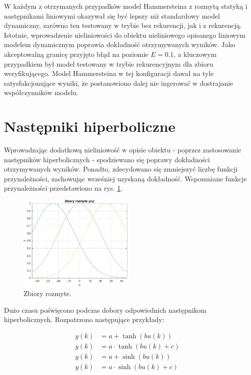 W każdym z otrzymanych przypadków model Hammersteina z rozmytą statyką i następnikami liniowymi okazywał się być lepszy niż standardowy model dynamiczny, zarówno ten testowany w trybie bez rekurencji, jak i z rekurencją. Istotnie, wprowadzenie nieliniowości do obiektu nieliniowego opisanego liniowym modelem dynamicznym poprawia dokładność otrzymywanych wyników. Jako akceptowalną granicę przyjęto błąd na poziomie $E = \num{0.1}$, a kluczowym przypadkiem był model testowany w trybie rekurencyjnym dla zbioru weryfikującego. Model Hammersteina w tej konfiguracji dawał na tyle satysfakcjonujące wyniki, że postanowiono dalej nie ingerować w dostrajanie współczynników modelu. 

\newpage

\section{Następniki hiperboliczne}
Wprowadzając dodatkową nieliniowość w opisie obiektu - poprzez zastosowanie następników hiperbolicznych - spodziewano się poprawy dokładności otrzymywanych wyników. Ponadto, zdecydowano się zmniejszyć liczbę funkcji przynależności, zachowując wcześniej uzyskaną dokładność. Wspomniane funkcje przynależności przedstawiono na rys. \ref{sets_ham_nlin}.

\begin{figure}[h!]
\centering
\includegraphics[width=0.5\textwidth]{pictures/fuzzy_set_ham_nlin}
\caption{Zbiory rozmyte.}
\label{sets_ham_nlin}
\end{figure}

Dużo czasu poświęcono podczas dobory odpowiednich następnikom hiperbolicznych. Rozpatrzono następujące przykłady:

\begin{equation}
\begin{aligned}
y(k) &= a + \tanh(b u(k)) \\
y(k) &= a \cdot \tanh(b u(k) + c) \\
y(k) &= a + \sinh(b u(k)) \\
y(k) &= a \cdot \sinh(b u(k) + c) \\
\end{aligned} 
\end{equation}

